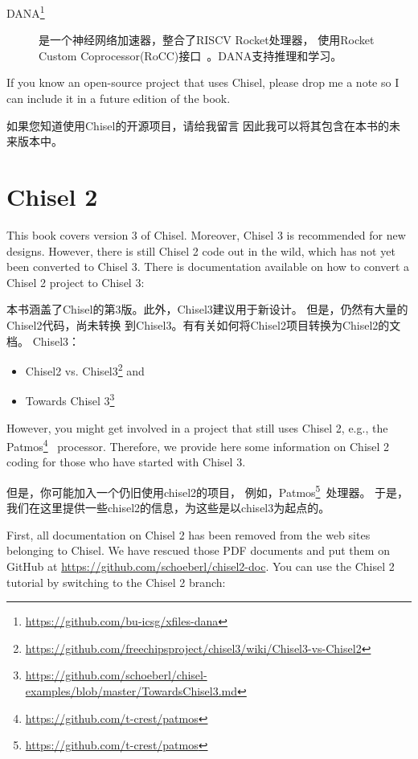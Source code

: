 \documentclass[%
    10pt,
    headinclude, footexclude,
    openright, %
    notitlepage,
    cleardoubleempty,
    headsepline,
    pointlessnumbers,
    bibtotoc, idxtotoc,
    ]{scrbook}
\newcommand{\myref}[2]{\href{#1}{#2}}
\renewcommand{\myref}[2]{{#2}{\footnote{\url{#1}}}}
\begin{document}
{\begin{description}
\item[\myref{https://github.com/bu-icsg/xfiles-dana}{DANA}] 是一个神经网络加速器，整合了RISCV Rocket处理器，
使用Rocket Custom Coprocessor(RoCC)接口~\cite{RoCC:2015}。DANA支持推理和学习。

\end{description}

If you know an open-source project that uses Chisel, please drop me a note
so I can include it in a future edition of the book.

如果您知道使用Chisel的开源项目，请给我留言
因此我可以将其包含在本书的未来版本中。

\chapter{Chisel 2}

This book covers version 3 of Chisel. Moreover, Chisel 3 is recommended for new designs.
However, there is still Chisel 2 code out in the wild, which has not yet been converted
to Chisel 3. There is documentation available on how to convert a Chisel 2 project to
Chisel 3:


本书涵盖了Chisel的第3版。此外，Chisel3建议用于新设计。
但是，仍然有大量的Chisel2代码，尚未转换
到Chisel3。有有关如何将Chisel2项目转换为Chisel2的文档。
Chisel3：

\begin{itemize}
\item \myref{https://github.com/freechipsproject/chisel3/wiki/Chisel3-vs-Chisel2}{Chisel2 vs. Chisel3} and
\item \myref{https://github.com/schoeberl/chisel-examples/blob/master/TowardsChisel3.md}{Towards Chisel 3}
\end{itemize}


However, you might get involved in a project that still uses Chisel 2,
e.g., the \myref{https://github.com/t-crest/patmos}{Patmos}~\cite{patmos:rts2018} processor.
Therefore, we provide here some information on Chisel 2 coding for those who
have started with Chisel 3.

但是，你可能加入一个仍旧使用chisel2的项目，
例如，\myref{https://github.com/t-crest/patmos}{Patmos}~\cite{patmos:rts2018}处理器。
于是，我们在这里提供一些chisel2的信息，为这些是以chisel3为起点的。

First, all documentation on Chisel 2 has been removed from the web sites
belonging to Chisel. We have rescued those PDF documents and put them
on GitHub at \url{https://github.com/schoeberl/chisel2-doc}.
You can use the Chisel 2 tutorial by switching to the Chisel 2 branch:

}
\end{document}
